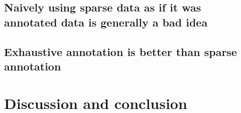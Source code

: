 \subsection{Naively using sparse data as if it was annotated data is generally a bad idea}

\subsection{Exhaustive annotation is better than sparse annotation }



\section{Discussion and conclusion}

\parencite{haridas2015interactive, petit2018handling, petit2021iterative}